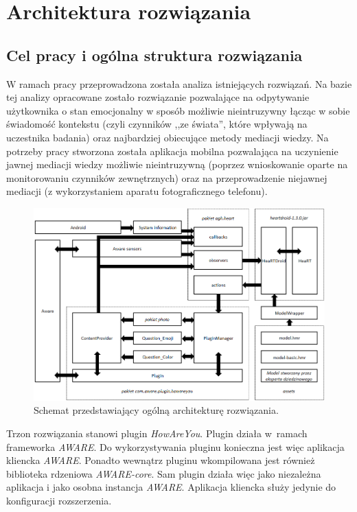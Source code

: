 \chapter{Architektura rozwiązania}
\label{cha:architekturaRozwiazania}


\section{Cel pracy i ogólna struktura rozwiązania}
\label{sec:celPracyIOgolnaStrukturaRozwiazania}

W ramach pracy przeprowadzona została analiza istniejących rozwiązań. Na bazie tej analizy opracowane zostało rozwiązanie pozwalające na odpytywanie użytkownika o stan emocjonalny w sposób możliwie nieintruzywny łącząc w sobie świadomość kontekstu (czyli czynników ,,ze świata'', które wpływają na uczestnika badania) oraz najbardziej obiecujące metody mediacji wiedzy. Na potrzeby pracy stworzona została aplikacja mobilna pozwalająca na uczynienie jawnej mediacji wiedzy możliwie nieintruzywną (poprzez wnioskowanie oparte na monitorowaniu czynników zewnętrznych) oraz na przeprowadzenie niejawnej mediacji (z wykorzystaniem aparatu fotograficznego telefonu).  

\begin{figure}[H]
	\centering
	\includegraphics[scale=0.8]{rozdzial3/ArchitekturaSchemat.png}
	\caption{Schemat przedstawiający ogólną architekturę rozwiązania.}
\end{figure}

Trzon rozwiązania stanowi plugin \textit{HowAreYou}. Plugin działa w~ramach frameworka \textit{AWARE}. Do wykorzystywania pluginu konieczna jest więc aplikacja kliencka \textit{AWARE}. Ponadto wewnątrz pluginu wkompilowana jest również biblioteka rdzeniowa \textit{AWARE-core}. Sam plugin działa więc jako niezależna aplikacja i jako osobna instancja \textit{AWARE}. Aplikacja kliencka służy jedynie do konfiguracji rozszerzenia.

